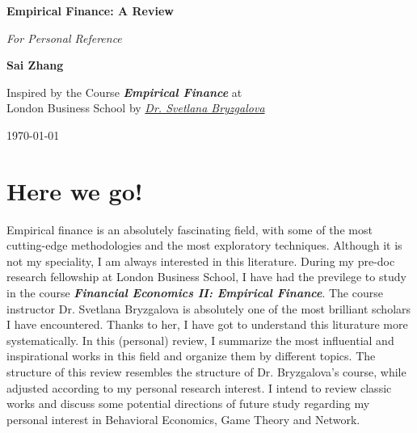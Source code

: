 \documentclass[12pt,openany]{report}
\begin{document}
\begin{titlepage}
    \begin{center}
        \vspace*{1cm}
        
        \Huge
        \textbf{Empirical Finance: A Review}

        \Large
        \textit{For Personal Reference}
            
        \vspace{2.5cm}
        
        \LARGE    
        \textbf{Sai Zhang}
            
        \vfill
        
        \large    
        Inspired by the Course \textbf{\textit{Empirical Finance}} at\\
        London Business School by \href{https://sabryzgalova.com/research/}{\textit{Dr. Svetlana Bryzgalova}}
            
        \vspace{0.8cm}
        \large
        \today
            
    \end{center}
\end{titlepage}


\chapter*{Here we go!}

Empirical finance is an absolutely fascinating field, with some of 
the most cutting-edge methodologies and the most exploratory 
techniques. Although it is not my speciality, I am always interested
in this literature. During my pre-doc research fellowship at London
Business School, I have had the previlege to study in the course
\textit{\textbf{Financial Economics II: Empirical Finance}}. The course
instructor Dr. Svetlana Bryzgalova is absolutely one of the most brilliant
scholars I have encountered. Thanks to her, I have got to understand 
this liturature more systematically. In this (personal) review, I summarize
the most influential and inspirational works in this field and organize
them by different topics. The structure of this review resembles the structure
of Dr. Bryzgalova's course, while adjusted according to my personal research
interest. I intend to review classic works and discuss some potential directions
of future study regarding my personal interest in Behavioral Economics, Game Theory
and Network.
\end{document}
